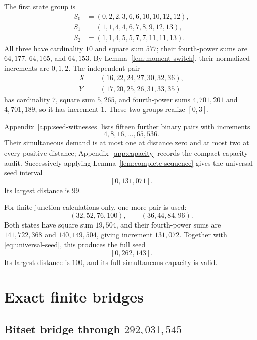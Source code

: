 \documentclass[11pt]{article}
\theoremstyle{definition}
\theoremstyle{remark}
\begin{document}
The first state group is
\begin{align*}
  S_0&=(0,2,2,3,6,6,10,10,12,12),\\
  S_1&=(1,1,4,4,6,7,8,9,12,13),\\
  S_2&=(1,1,4,5,5,7,7,11,11,13).
\end{align*}
All three have cardinality $10$ and square sum $577$; their fourth-power sums
are $64{,}177$, $64{,}165$, and $64{,}153$.  By
Lemma~\ref{lem:moment-switch}, their normalized increments are $0,1,2$.
The independent pair
\begin{align*}
  X&=(16,22,24,27,30,32,36),\\
  Y&=(17,20,25,26,31,33,35)
\end{align*}
has cardinality $7$, square sum $5{,}265$, and fourth-power sums
$4{,}701{,}201$ and $4{,}701{,}189$, so it has increment $1$.  These two
groups realize $[0,3]$.

Appendix~\ref{app:seed-witnesses} lists fifteen further binary pairs with
increments
\[
  4,8,16,\ldots,65{,}536.
\]
Their simultaneous demand is at most one at distance zero and at most two at
every positive distance; Appendix~\ref{app:capacity} records the compact
capacity audit.  Successively applying Lemma~\ref{lem:complete-sequence}
gives the universal seed interval
\begin{equation}\label{eq:universal-seed}
  [0,131{,}071].
\end{equation}
Its largest distance is $99$.

For finite junction calculations only, one more pair is used:
\[
  (32,52,76,100),
  \qquad
  (36,44,84,96).
\]
Both states have square sum $19{,}504$, and their fourth-power sums are
$141{,}722{,}368$ and $140{,}149{,}504$, giving increment $131{,}072$.
Together with \eqref{eq:universal-seed}, this produces the full seed
\begin{equation}\label{eq:full-seed}
  [0,262{,}143].
\end{equation}
Its largest distance is $100$, and its full simultaneous capacity is valid.

\section{Exact finite bridges}

\subsection{Bitset bridge through $292{,}031{,}545$}
\end{document}
